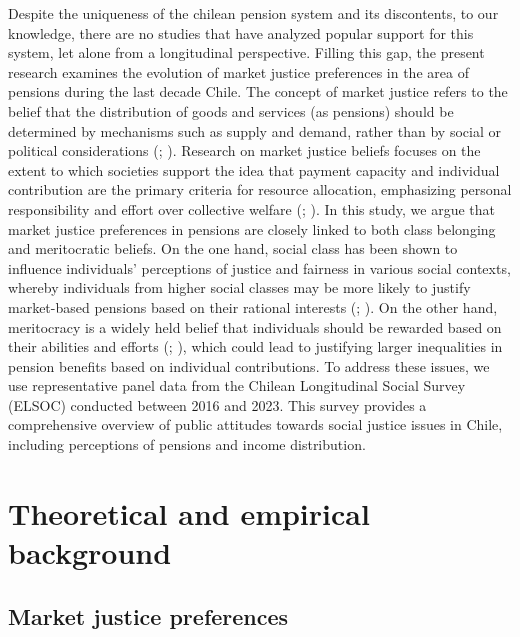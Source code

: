 \documentclass[
  12pt,
]{article}
\begin{document}
Despite the uniqueness of the chilean pension system and its
discontents, to our knowledge, there are no studies that have analyzed
popular support for this system, let alone from a longitudinal
perspective. Filling this gap, the present research examines the
evolution of market justice preferences in the area of pensions during
the last decade Chile. The concept of market justice refers to the
belief that the distribution of goods and services (as pensions) should
be determined by mechanisms such as supply and demand, rather than by
social or political considerations
(;
). Research on market
justice beliefs focuses on the extent to which societies support the
idea that payment capacity and individual contribution are the primary
criteria for resource allocation, emphasizing personal responsibility
and effort over collective welfare
(;
). In this
study, we argue that market justice preferences in pensions are closely
linked to both class belonging and meritocratic beliefs. On the one
hand, social class has been shown to influence individuals' perceptions
of justice and fairness in various social contexts, whereby individuals
from higher social classes may be more likely to justify market-based
pensions based on their rational interests
(;
). On the other
hand, meritocracy is a widely held belief that individuals should be
rewarded based on their abilities and efforts
(;
), which could lead to
justifying larger inequalities in pension benefits based on individual
contributions. To address these issues, we use representative panel data
from the Chilean Longitudinal Social Survey (ELSOC) conducted between
2016 and 2023. This survey provides a comprehensive overview of public
attitudes towards social justice issues in Chile, including perceptions
of pensions and income distribution.

\section{Theoretical and empirical
background}\label{theoretical-and-empirical-background}

\subsection{Market justice
preferences}\label{market-justice-preferences}
\end{document}
